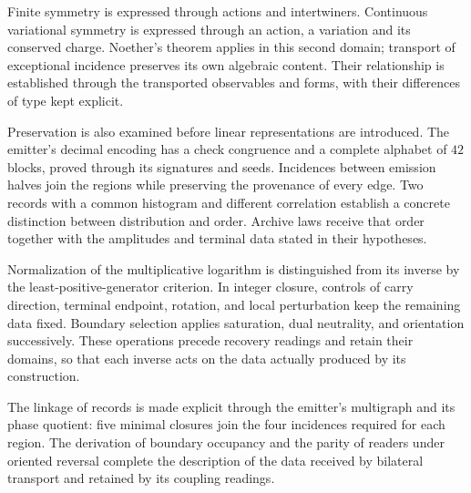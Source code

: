 Finite symmetry is expressed through actions and intertwiners. Continuous variational symmetry is expressed through an action, a variation and its conserved charge. Noether's theorem applies in this second domain; transport of exceptional incidence preserves its own algebraic content. Their relationship is established through the transported observables and forms, with their differences of type kept explicit.

Preservation is also examined before linear representations are
introduced. The emitter's decimal encoding has a check congruence
and a complete alphabet of \(42\) blocks, proved through its signatures
and seeds. Incidences between emission halves join the regions while
preserving the provenance of every edge. Two records with a common
histogram and different correlation establish a concrete distinction
between distribution and order. Archive laws receive that order together
with the amplitudes and terminal data stated in their hypotheses.

Normalization of the multiplicative logarithm is distinguished from its
inverse by the least-positive-generator criterion. In integer closure,
controls of carry direction, terminal endpoint, rotation, and local
perturbation keep the remaining data fixed. Boundary selection applies
saturation, dual neutrality, and orientation successively. These operations
precede recovery readings and retain their domains, so that each inverse
acts on the data actually produced by its construction.

The linkage of records is made explicit through the emitter's multigraph
and its phase quotient: five minimal closures join the four incidences
required for each region. The derivation of boundary occupancy and the
parity of readers under oriented reversal complete the description of
the data received by bilateral transport and retained by its coupling
readings.
